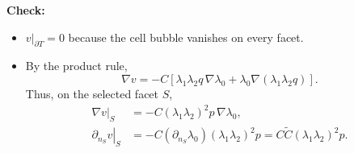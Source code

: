 \documentclass[12pt,a4paper]{article}
\newcommand{\dn}{\partial_n}
\newcommand{\Rone}{R_{\partial T}^{1}}
\begin{document}
\textbf{Check:}
\begin{itemize}
    \item $v|_{\partial T}=0$ because the cell bubble vanishes on every facet.
    \item By the product rule,
    \begin{equation}
        \nabla v=-C\left[\lambda_1\lambda_2q\,\nabla\lambda_0
             +\lambda_0\nabla(\lambda_1\lambda_2q)\right].
    \end{equation}
    Thus, on the selected facet $S$,
    \begin{align}
        \left.\nabla v\right|_S
            &=-C(\lambda_1\lambda_2)^2p\,\nabla\lambda_0,\\
        \left.\partial_{n_S}v\right|_S
            &=-C(\partial_{n_S}\lambda_0)(\lambda_1\lambda_2)^2p
             =C\tilde C(\lambda_1\lambda_2)^2p.
    \end{align}







\end{itemize}
\end{document}
